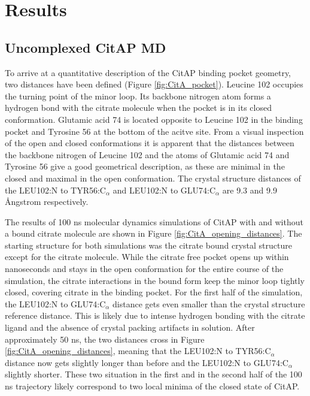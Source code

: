 \documentclass[english, a4paper, 12pt, titlepage, draft]{article}
\begin{document}
\section{Results}

\subsection{Uncomplexed CitAP MD}

To arrive at a quantitative description of the CitAP binding pocket geometry, two distances have been defined (Figure \ref{fig:CitA_pocket}).
Leucine 102 occupies the turning point of the minor loop.
Its backbone nitrogen atom forms a hydrogen bond with the citrate molecule when the pocket is in its closed conformation.
Glutamic acid 74 is located opposite to Leucine 102 in the binding pocket and Tyrosine 56 at the bottom of the acitve site.
From a visual inspection of the open and closed conformations it is apparent that the distances between the backbone nitrogen of Leucine 102 and the  atoms of Glutamic acid 74 and Tyrosine 56 give a good geometrical description, as these are minimal in the closed and maximal in the open conformation.
The crystal structure distances of the LEU102:N to TYR56:C$_{\alpha}$ and LEU102:N to GLU74:C$_{\alpha}$ are 9.3 and 9.9 \r{A}ngstrom respectively.

The results of 100 ns molecular dynamics simulations of CitAP with and without a bound citrate molecule are shown in Figure \ref{fig:CitA_opening_distances}.
The starting structure for both simulations was the citrate bound crystal structure except for the citrate molecule.
While the citrate free pocket opens up within nanoseconds and stays in the open conformation for the entire course of the simulation, the citrate interactions in the bound form keep the minor loop tightly closed, covering citrate in the binding pocket.
For the first half of the simulation, the LEU102:N to GLU74:C$_{\alpha}$ distance gets even smaller than the crystal structure reference distance.
This is likely due to intense hydrogen bonding with the citrate ligand and the absence of crystal packing artifacts in solution.
After approximately 50 ns, the two distances cross in Figure \ref{fig:CitA_opening_distances}, meaning that the LEU102:N to TYR56:C$_{\alpha}$ distance now gets slightly longer than before and the LEU102:N to GLU74:C$_{\alpha}$ slightly shorter.
These two situation in the first and in the second half of the 100 ns trajectory likely correspond to two local minima of the closed state of CitAP.
\end{document}
